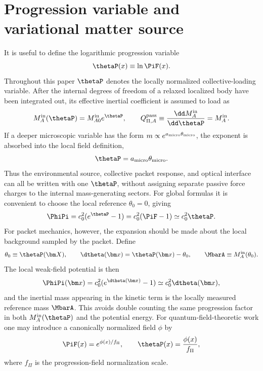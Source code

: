 \documentclass[12pt]{article}
\begin{document}
\section{Progression variable and variational matter source}

It is useful to define the logarithmic progression variable
\begin{equation}
    \thetaP(x) \equiv \ln \PiF(x).
    \label{eq:theta-def}
\end{equation}
Throughout this paper \(\thetaP\) denotes the locally normalized collective-loading variable.  After the internal degrees of freedom of a relaxed localized body have been integrated out, its effective inertial coefficient is assumed to load as
\begin{equation}
    M_A^{\rm in}(\thetaP)=M_{A0}^{\rm in}e^{\thetaP},
    \qquad
    Q_{\Pi,A}^{\rm pass}\equiv \frac{\dd M_A^{\rm in}}{\dd\thetaP}=M_A^{\rm in} .
    \label{eq:local-normalized-mass}
\end{equation}
If a deeper microscopic variable has the form \(m\propto e^{a_{\rm micro}\theta_{\rm micro}}\), the exponent is absorbed into the local field definition,
\begin{equation}
    \thetaP=a_{\rm micro}\theta_{\rm micro}.
    \label{eq:micro-to-local-theta}
\end{equation}
Thus the environmental source, collective packet response, and optical interface can all be written with one \(\thetaP\), without assigning separate passive force charges to the internal mass-generating sectors.  For global formulas it is convenient to choose the local reference \(\theta_0=0\), giving
\begin{equation}
    \PhiPi=c_0^2(e^{\thetaP}-1)
    =c_0^2(\PiF-1)
    \simeq c_0^2\thetaP .
    \label{eq:normalized-Phi}
\end{equation}
For packet mechanics, however, the expansion should be made about the local background sampled by the packet.  Define
\begin{equation}
    \theta_0\equiv\thetaP(\bm X),
    \qquad
    \dtheta(\bm x)=\thetaP(\bm x)-\theta_0,
    \qquad
    \MbarA\equiv M_A^{\rm in}(\theta_0).
    \label{eq:local-background-mass}
\end{equation}
The local weak-field potential is then
\begin{equation}
    \PhiPi(\bm x)=c_0^2(e^{\dtheta(\bm x)}-1)
    \simeq c_0^2\dtheta(\bm x),
    \label{eq:local-dtheta-potential}
\end{equation}
and the inertial mass appearing in the kinetic term is the locally measured reference mass \(\MbarA\).  This avoids double counting the same progression factor in both \(M_A^{\rm in}(\thetaP)\) and the potential energy.
For quantum-field-theoretic work one may introduce a canonically normalized field \(\phi\) by
\begin{equation}
    \PiF(x)=e^{\phi(x)/f_\Pi},
    \qquad
    \thetaP(x)=\frac{\phi(x)}{f_\Pi},
    \label{eq:canonical-field}
\end{equation}
where \(f_\Pi\) is the progression-field normalization scale.
\end{document}
